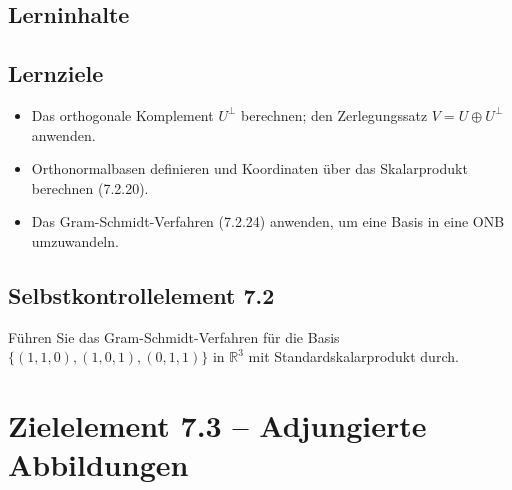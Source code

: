 \documentclass[a4paper,12pt]{article}
\begin{document}
\subsection*{Lerninhalte}
\begin{center}
\end{center}

\subsection*{Lernziele}
\begin{itemize}
  \item Das orthogonale Komplement $U^\perp$ berechnen; den Zerlegungssatz $V = U \oplus U^\perp$ anwenden.
  \item Orthonormalbasen definieren und Koordinaten über das Skalarprodukt berechnen (7.2.20).
  \item Das Gram-Schmidt-Verfahren (7.2.24) anwenden, um eine Basis in eine ONB umzuwandeln.
\end{itemize}

\subsection*{Selbstkontrollelement 7.2}
Führen Sie das Gram-Schmidt-Verfahren für die Basis $\{(1,1,0),(1,0,1),(0,1,1)\}$ in $\mathbb{R}^3$ mit Standardskalarprodukt durch.

\newpage

\section*{Zielelement 7.3 -- Adjungierte Abbildungen}
\end{document}
